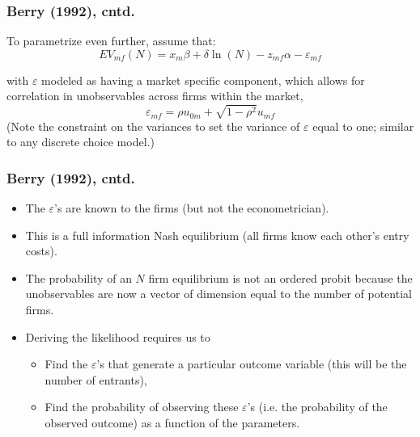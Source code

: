 \documentclass[xcolor=pdftex,dvipsnames,table,mathserif]{beamer}
\begin{document}
\begin{frame}
\frametitle{Berry (1992), cntd.}
To parametrize even further, assume that:\ \ 
\begin{equation}
EV_{mf}(N)=x_{m}\beta +\delta \ln (N)-z_{mf}\alpha -\varepsilon _{mf}
\label{entry6}
\end{equation}

with $\varepsilon $ modeled as having a market specific component, which
allows for correlation in unobservables across firms within the market, 
\begin{equation*}
\varepsilon _{mf}=\rho u_{0m}+\sqrt{1-\rho ^{2}}u_{mf}
\end{equation*}
(Note the constraint on the variances to set the variance of $\varepsilon $
equal to one; similar to any discrete choice model.)
\end{frame}
\begin{frame}

\frametitle{Berry (1992), cntd.}
\begin{itemize}
\item The $\varepsilon $'s are known to the firms (but not the
econometrician).

\item This is a full information Nash equilibrium (all firms know each
other's entry costs).

\item The probability of an $N$ firm equilibrium is not an ordered probit
because the unobservables are now a vector of dimension equal to the number
of potential firms.

\item Deriving the likelihood requires us to

\begin{itemize}
\item Find the $\varepsilon $'s that generate a particular outcome variable
(this will be the number of entrants),

\item Find the probability of observing these $\varepsilon $'s (i.e. the
probability of the observed outcome) as a function of the parameters.
\end{itemize}
\end{itemize}

\end{frame}
\end{document}
